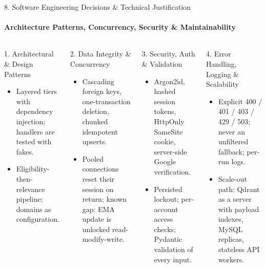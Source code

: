 \documentclass[aspectratio=169, 11pt]{beamer}
\begin{document}
\begin{frame}{8. Software Engineering Decisions \& Technical Justification}
    \framesubtitle{Architecture Patterns, Concurrency, Security \& Maintainability}
    \begin{columns}[T]
        \begin{block}{1. Architectural \& Design Patterns}
            \scriptsize
            \begin{itemize}
                \item Layered tiers with dependency injection; handlers are tested with fakes.
                \item Eligibility-then-relevance pipeline; domains as configuration.
            \end{itemize}
        \end{block}
        \begin{block}{2. Data Integrity \& Concurrency}
            \scriptsize
            \begin{itemize}
                \item Cascading foreign keys, one-transaction deletion, chunked idempotent upserts.
                \item Pooled connections reset their session on return; known gap: EMA update is unlocked read-modify-write.
            \end{itemize}
        \end{block}
        \begin{block}{3. Security, Auth \& Validation}
            \scriptsize
            \begin{itemize}
                \item Argon2id, hashed session tokens, HttpOnly SameSite cookie, server-side Google verification.
                \item Persisted lockout; per-account access checks; Pydantic validation of every input.
            \end{itemize}
        \end{block}
        \begin{block}{4. Error Handling, Logging \& Scalability}
            \scriptsize
            \begin{itemize}
                \item Explicit 400 / 401 / 403 / 429 / 503; never an unfiltered fallback; per-run logs.
                \item Scale-out path: Qdrant as a server with payload indexes, MySQL replicas, stateless API workers.
            \end{itemize}
        \end{block}
    \end{columns}
\end{frame}
\end{document}
